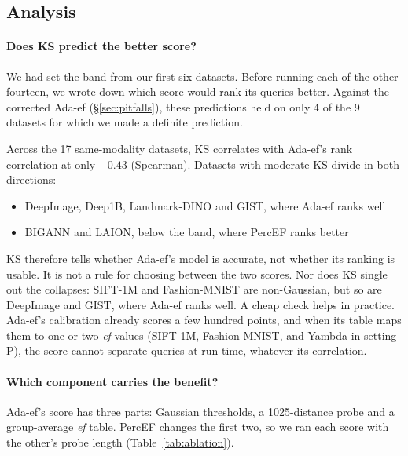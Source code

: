 \documentclass[twocolumn]{svjour3}
\newcommand{\ef}{\textit{ef}}
\begin{document}
\subsection{Analysis}\label{sec:analysis}

\paragraph{Does KS predict the better score?}\label{sec:predict}
We had set the band from our first six datasets. Before running each of the other fourteen, we wrote
down which score would rank its queries better. Against the corrected Ada-ef (\S\ref{sec:pitfalls}),
these predictions held on only 4 of the 9 datasets for which we made a definite prediction.

Across the 17 same-modality datasets, KS correlates with Ada-ef's rank correlation at only $-0.43$
(Spearman). Datasets with moderate KS divide in both directions:
\begin{itemize}
\item DeepImage, Deep1B, Landmark-DINO and GIST, where Ada-ef ranks well
\item BIGANN and LAION, below the band, where PercEF ranks better
\end{itemize}
KS therefore tells whether Ada-ef's model is accurate, not whether its ranking is usable. It is not
a rule for choosing between the two scores. Nor does KS single out the collapses: SIFT-1M and
Fashion-MNIST are non-Gaussian, but so are DeepImage and GIST, where Ada-ef ranks well. A cheap
check helps in practice. Ada-ef's calibration already scores a few hundred points, and when its
table maps them to one or two \ef{} values (SIFT-1M, Fashion-MNIST, and Yambda in setting P), the
score cannot separate queries at run time, whatever its correlation.

\paragraph{Which component carries the benefit?}\label{sec:ablation}
Ada-ef's score has three parts: Gaussian thresholds, a 1025-distance probe and a group-average \ef{}
table. PercEF changes the first two, so we ran each score with the other's probe length
(Table~\ref{tab:ablation}).
\end{document}
